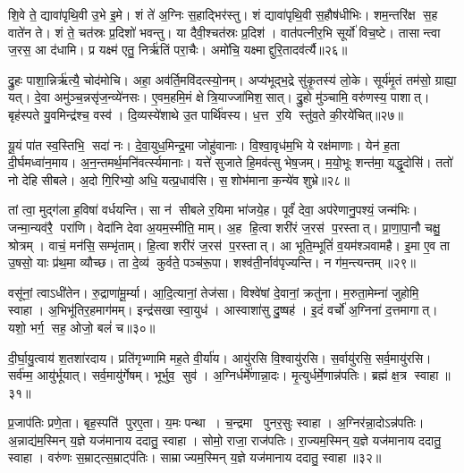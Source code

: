 शि॒वे ते॒ द्यावा॑पृथि॒वी उ॒भे इ॒मे।
शं ते॑ अ॒ग्निः स॒हाद्भिर॑स्तु।
शं द्यावा॑पृथि॒वी स॒हौष॑धीभिः।
शम॒न्तरि॑क्ष स॒ह वाते॑न ते।
शं ते॒ चत॑स्रः प्र॒दिशो॑ भवन्तु।
या दैवी॒श्चत॑स्रः प्र॒दिश॑।
वात॑पत्नीर॒भि सूर्यो॑ विच॒ष्टे।
तासान्त्वा ज॒रस॒ आ द॑धामि।
प्र यक्ष्म॑ एतु॒ निर्\mbox{}ऋ॑तिं परा॒चैः।
अमो॑चि॒ यक्ष्माद्दुरि॒तादव॑र्त्यै॥२६॥

द्रु॒हः पाशा॒न्निर्\mbox{}ऋ॑त्यै॒ चोद॑मोचि।
अहा॒ अव॑र्ति॒मवि॑दत्स्यो॒नम्।
अप्य॑भूद्भ॒द्रे सु॑कृ॒तस्य॑ लो॒के।
सूर्य॑मृ॒तं तम॑सो॒ ग्राह्या॒ यत्।
दे॒वा अमु॑ञ्च॒न्नसृ॑ज॒न्व्ये॑नसः।
ए॒वम॒हमि॒मं क्षेत्रि॒याज्जा॑मिश॒सात्।
द्रु॒हो मु॑ञ्चामि॒ वरु॑णस्य॒ पाशात्।
बृह॑स्पते यु॒वमिन्द्र॑श्च॒ वस्व॑।
दि॒व्यस्ये॑शाथे उ॒त पार्थि॑वस्य।
ध॒त्त र॒यि स्तु॑व॒ते की॒रये॑चित्॥२७॥

यू॒यं पा॑त स्व॒स्तिभि॒ सदा॑ नः।
दे॒वा॒युध॒मिन्द्र॒मा जोहु॑वानाः।
वि॒श्वा॒वृध॑म॒भि ये रक्ष॑माणाः।
येन॑ ह॒ता दी॒र्घमध्वा॑न॒माय\sn{}।
अ॒न॒न्तमर्थ॒मनि॑वर्त्स्यमानाः।
यत्ते॑ सुजाते हि॒मव॑त्सु भेष॒जम्।
म॒यो॒भूः शन्त॑मा॒ यद्धृ॒दोसि॑।
ततो॑ नो देहि सीबले।
अ॒दो गि॒रिभ्यो॒ अधि॒ यत्प्र॒धाव॑सि।
स॒शोभ॑माना क॒न्ये॑व शुभ्रे॥२८॥

तां त्वा॒ मुद्ग॑ला ह॒विषा॑ वर्धयन्ति।
सा न॑ सीबले र॒यिमा भा॑जये॒ह।
पूर्वं॑ देवा॒ अप॑रेणानु॒पश्यं॒ जन्म॑भिः।
जन्मा॒न्यव॑रै॒ परा॑णि।
वेदा॑नि देवा अ॒यम॒स्मीति॒ माम्।
अ॒ह हि॒त्वा शरी॑रं ज॒रस॑ प॒रस्तात्।
प्रा॒णा॒पा॒नौ चक्षु॒ श्रोत्रम्।
वाचं॒ मन॑सि॒ सम्भृ॑ताम्।
हि॒त्वा शरी॑रं ज॒रस॑ प॒रस्तात्।
आ भूति॒म्भूतिं॑ व॒यम॑श्ञवामहै।
इ॒मा ए॒व ता उ॒षसो॒ याः प्र॑थ॒मा व्यौच्छ\sn{}।
ता दे॒व्य॑ कुर्वते॒ पञ्च॑रू॒पा।
शश्व॑ती॒र्नाव॑पृज्यन्ति।
न ग॑म॒न्त्यन्तम्॥२९॥\anuvakamend[क॒रो॒म्यव॑र्त्यै चिच्छुभ्रेऽश्ञवामहै च॒त्वारि॑ च]

वसू॑नां॒ त्वाऽधी॑तेन।
रु॒द्राणा॑मू॒र्म्या।
आ॒दि॒त्यानां॒ तेज॑सा।
विश्वे॑षां दे॒वानां॒ क्रतु॑ना।
म॒रुता॒मेम्ना॑ जुहोमि॒ स्वाहा।
अ॒भिभू॑तिर॒हमाग॑मम्।
इन्द्र॑सखा स्वा॒युध॑।
आस्वाशा॑सु दु॒ष्षह॑।
इ॒दं वर्चो॑ अ॒ग्निना॑ द॒त्तमागात्।
यशो॒ भर्ग॒ सह॒ ओजो॒ बलं॑ च॥३०॥

दी॒र्घा॒यु॒त्वाय॑ श॒तशा॑रदाय।
प्रति॑गृभ्णामि मह॒ते वी॒र्या॑य।
आयु॑रसि वि॒श्वायु॑रसि।
स॒र्वायु॑रसि॒ सर्व॒मायु॑रसि।
सर्व॑म्म॒ आयु॑र्भूयात्।
सर्व॒मायु॑र्गेषम्।
भूर्भुव॒ सुव॑।
अ॒ग्निर्धर्मे॑णान्ना॒दः।
मृ॒त्युर्धर्मे॒णान्न॑पतिः।
ब्रह्म॑ क्ष॒त्र स्वाहा॥३१॥

प्र॒जाप॑तिः प्रणे॒ता।
बृह॒स्पति॑ पुरए॒ता।
य॒मः पन्था।
च॒न्द्रमा पुनर॒सुः स्वाहा।
अ॒ग्निर॑न्ना॒दोऽन्न॑पतिः।
अ॒न्नाद्य॑म॒स्मिन् य॒ज्ञे यज॑मानाय ददातु॒ स्वाहा।
सोमो॒ राजा॒ राज॑पतिः।
रा॒ज्यम॒स्मिन् य॒ज्ञे यज॑मानाय ददातु॒ स्वाहा।
वरु॑णः स॒म्राट्त्स॒म्राट्प॑तिः।
साम्राज्यम॒स्मिन् य॒ज्ञे यज॑मानाय ददातु॒ स्वाहा॥३२॥


